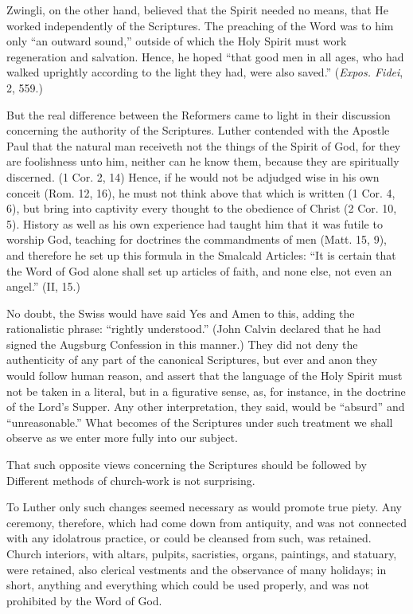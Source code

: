 \documentclass[
]{book}
\begin{document}
Zwingli, on the other hand, believed that the Spirit needed no means, that He worked independently of the Scriptures. The preaching of the Word was to him only ``an outward sound,'' outside of which the Holy Spirit must work regeneration and salvation. Hence, he hoped ``that good men in all ages, who had walked uprightly according to the light they had, were also saved.'' (\emph{Expos. Fidei}, 2, 559.)

But the real difference between the Reformers came to light in their discussion concerning the authority of the Scriptures. Luther contended with the Apostle Paul that the natural man receiveth not the things of the Spirit of God, for they are foolishness unto him, neither can he know them, because they are spiritually discerned. (1 Cor. 2, 14) Hence, if he would not be adjudged wise in his own conceit (Rom. 12, 16), he must not think above that which is written (1 Cor. 4, 6), but bring into captivity every thought to the obedience of Christ (2 Cor. 10, 5). History as well as his own experience had taught him that it was futile to worship God, teaching for doctrines the commandments of men (Matt. 15, 9), and therefore he set up this formula in the Smalcald Articles: ``It is certain that the Word of God alone shall set up articles of faith, and none else, not even an angel.'' (II, 15.)

No doubt, the Swiss would have said Yes and Amen to this, adding the rationalistic phrase: ``rightly understood.'' (John Calvin declared that he had signed the Augsburg Confession in this manner.) They did not deny the authenticity of any part of the canonical Scriptures, but ever and anon they would follow human reason, and assert that the language of the Holy Spirit must not be taken in a literal, but in a figurative sense, as, for instance, in the doctrine of the Lord's Supper. Any other interpretation, they said, would be ``absurd'' and ``unreasonable.'' What becomes of the Scriptures under such treatment we shall observe as we enter more fully into our subject.

That such opposite views concerning the Scriptures should be followed by Different methods of church-work is not surprising.

To Luther only such changes seemed necessary as would promote true piety. Any ceremony, therefore, which had come down from antiquity, and was not connected with any idolatrous practice, or could be cleansed from such, was retained. Church interiors, with altars, pulpits, sacristies, organs, paintings, and statuary, were retained, also clerical vestments and the observance of many holidays; in short, anything and everything which could be used properly, and was not prohibited by the Word of God.
\end{document}
